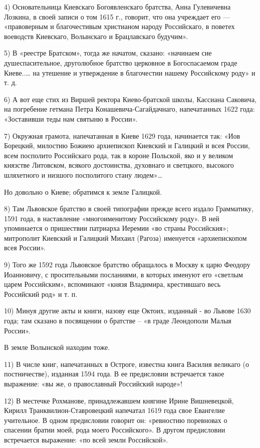 4) Основательница Киевскаго Богоявленскаго братства, Анна Гулевичевна Лозкина,
в своей записи о том 1615 г., говорит, что она учреждает его — «правоверным и
благочестивым христианом народу Российскаго, в поветех воеводств Киевскаго,
Волынскаго и Брацлавскаго будучим».

5) В «реестре Братском», тогда же начатом, сказано: «начинаем сие
душеспасительное, друголюбное братство цер­ковное в Богоспасаемом граде
Киеве..… на утешение и утверждение в благочестии нашему Российскому роду» и т.
д.

6) А вот еще стих из Виршей ректора Киево-братской школы, Кассиана Саковича, на
погребение гетмана Петра Конашевича-Сагайдачнаго, напечатанных 1622 года:
«Зоставивши теды нам святыню в России».

7) Окружная грамота, напечатанная в Киеве 1629 года, начинается так: «Иов
Борецкий, милостию Божиею архиепископ Киевский и Галицкий и всея России, всем
посполито Российскаго рода, так в короне Польской, яко и у великом князстве
Литовском, всякого достоинства, духовнаго и светцкого, высокого шляхетного и
низшого посполитого стану людем»…

Но довольно о Киеве; обратимся к земле Галицкой.

8) Там Львовское братство в своей типографии прежде всего издало Грамматику,
1591 года, в наставление «многоименитому Российскому роду». В ней упоминается о
пришествии патриарха Иеремии «во страны Российския»; митрополит Киевский и
Галицкий Михаил (Рагоза) именуется «архиепископом всея России».

9) Того же 1592 года Львовское братство обращалось в Москву к царю Феодору
Иоанновичу, с просительными посланиями, в которых именуют его «светлым царем
Российским», вспоминают «князя Владимира, крестившаго весь Российский род» и т.
п.

10) Минуя другие акты и книги, назову еще Октоих, изданный - во Львове 1630
года; там сказано в посвящении о братстве – «в граде Леондополи Малыя России».

В земле Волынской находим тоже.

11) В числе книг, напечатанных в Остроге, известна книга Василия великаго (о
постничестве), изданная 1594 года. В ее предисловии встречается такое
выражение: «вы же, о православный Российский народе»!

12) В местечке Рохманове, принадлежавшем княгине Ирине Вишневецкой, Кирилл
Транквилион-Ставровецкий напечатал 1619 года свое Евангелие учительное. В одном
предисловии говорит он: «ревностию поревновах о спасении братии моей, рода
моего Российского». В другом предисловии встречается выражение: «по всей земли
Российской».

